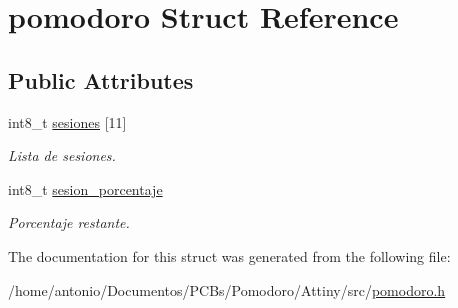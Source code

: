 \hypertarget{structpomodoro}{}\section{pomodoro Struct Reference}
\label{structpomodoro}
\subsection*{Public Attributes}
\begin{DoxyCompactItemize}
\item 
\mbox{\label{structpomodoro_adf95bc91816e37e5092ec1e917aae2bc}} 
int8\+\_\+t \mbox{\hyperlink{structpomodoro_adf95bc91816e37e5092ec1e917aae2bc}{sesiones}} \mbox{[}11\mbox{]}
\begin{DoxyCompactList}\small\item\em Lista de sesiones. \end{DoxyCompactList}\item 
\mbox{\label{structpomodoro_a3ad5e87e88b992dedc6b587141ecc62d}} 
int8\+\_\+t \mbox{\hyperlink{structpomodoro_a3ad5e87e88b992dedc6b587141ecc62d}{sesion\+\_\+porcentaje}}
\begin{DoxyCompactList}\small\item\em Porcentaje restante. \end{DoxyCompactList}\end{DoxyCompactItemize}


The documentation for this struct was generated from the following file\+:\begin{DoxyCompactItemize}
\item 
/home/antonio/\+Documentos/\+P\+C\+Bs/\+Pomodoro/\+Attiny/src/\mbox{\hyperlink{pomodoro_8h}{pomodoro.\+h}}\end{DoxyCompactItemize}
